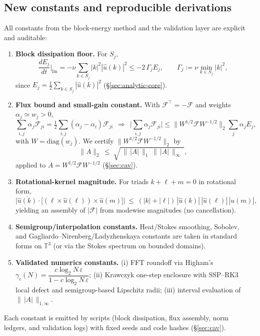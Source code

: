 \IfFileExists{nyjm.cls}{\documentclass[11pt]{nyjm}}{\documentclass[11pt]{amsart}}
\newcommand{\T}{\mathbb{T}}
\theoremstyle{plain}
\theoremstyle{definition}
\theoremstyle{remark}
\begin{document}
\subsection{New constants and reproducible derivations}\label{subsec:new-constants}
All constants from the block-energy method and the validation layer are explicit and auditable:
\begin{enumerate}
  \item \textbf{Block dissipation floor.} For $S_j$,
  \[
  \frac{dE_j}{dt}\Big|_{\mathrm{lin}}
  =-\nu\!\sum_{k\in S_j}\!|k|^2|\widehat u(k)|^2
  \le -2\,\Gamma_j E_j,\qquad
  \Gamma_j:=\nu\min_{k\in S_j}|k|^2,
  \]
  since $E_j=\tfrac12\sum_{k\in S_j}|\widehat u(k)|^2$ (\S\ref{sec:analytic-core}).
  \item \textbf{Flux bound and small-gain constant.} With $\mathcal F^\top=-\mathcal F$ and weights $\alpha_j\simeq w_j>0$,
  \[
  \sum_{i,j}\alpha_j\mathcal F_{ji}
  =\tfrac12\sum_{i,j}(\alpha_j-\alpha_i)\mathcal F_{ji}
  \ \ \Rightarrow\ \
  \Big|\sum_{i,j}\alpha_j\mathcal F_{ji}\Big|
  \le \|W^{1/2}\mathcal F W^{-1/2}\|_2 \sum_j \alpha_j E_j,
  \]
  with $W=\mathrm{diag}(w_j)$. We certify $\|W^{1/2}\mathcal F W^{-1/2}\|_2$ by
  \[
  \|A\|_2\ \le\ \sqrt{\ \|\,|A|\,\|_1\ \|\,|A|\,\|_\infty\ },
  \]
  applied to $A=W^{1/2}\mathcal F W^{-1/2}$ (\S\ref{sec:cav}).
  \item \textbf{Rotational-kernel magnitude.} For triads $k+\ell+m=0$ in rotational form,
  \[
  \big|\overline{\widehat u(k)}\cdot\big[(\ell\times \widehat u(\ell))\times \widehat u(m)\big]\big|
  \ \le\ (|k|+|\ell|)\,|\widehat u(k)|\,|\widehat u(\ell)|\,|\widehat u(m)|,
  \]
  yielding an assembly of $|\mathcal F|$ from modewise magnitudes (no cancellation).
  \item \textbf{Semigroup/interpolation constants.} Heat/Stokes smoothing, Sobolev, and Gagliardo–Nirenberg/Ladyzhenskaya constants are taken in standard forms on $\T^3$ (or via the Stokes spectrum on bounded domains). \cite{Temam2001,Sohr2001}
  \item \textbf{Validated numerics constants.} (i) FFT roundoff via Higham’s $\gamma_c(N)=\dfrac{c\log_2N\,\varepsilon}{1-c\log_2N\,\varepsilon}$; (ii) Krawczyk one-step enclosure with SSP–RK3 local defect and semigroup-based Lipschitz radii; (iii) interval evaluation of $\|\,|A|\,\|_{1,\infty}$. \cite{Higham2002,Neumaier1990,Rump1999,Tucker2011}
\end{enumerate}
Each constant is emitted by scripts (block dissipation, flux assembly, norm ledgers, and validation logs) with fixed seeds and code hashes (\S\ref{sec:cav}).
\end{document}
